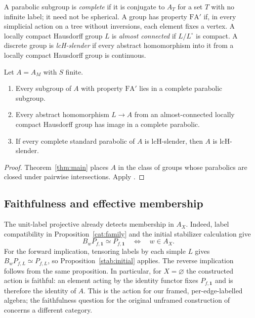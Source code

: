 A parabolic subgroup is \emph{complete} if it is conjugate to $A_T$
for a set $T$ with no infinite label; it need not be spherical.
A group has property $\mathrm{FA}'$ if, in every simplicial action on a
tree without inversions, each element fixes a vertex. A locally compact
Hausdorff group $L$ is \emph{almost connected} if $L/L^\circ$ is compact.
A discrete group is \emph{lcH-slender} if every abstract homomorphism
into it from a locally compact Hausdorff group is continuous.

\begin{corollary}
\label{cor:complete-parabolics}
Let $A=A_M$ with $S$ finite.
\begin{enumerate}
\item Every subgroup of $A$ with property $\mathrm{FA}'$ lies in a
complete parabolic subgroup.
\item Every abstract homomorphism $L\to A$ from an almost-connected
locally compact Hausdorff group has image in a complete parabolic.
\item If every complete standard parabolic of $A$ is lcH-slender,
then $A$ is lcH-slender.
\end{enumerate}
\end{corollary}
\begin{proof}
Theorem~\ref{thm:main} places $A$ in the class of groups whose parabolics
are closed under pairwise intersections. Apply
\cite[Proposition~1.3 and Theorem~1.7]{MoellerParisVarghese2024}.
\end{proof}


\subsection{Faithfulness and effective membership}
\label{sec:algorithms}

The unit-label projective already detects membership in $A_X$. Indeed,
label compatibility in Proposition~\ref{cat:family} and the initial
stabilizer calculation give
\begin{equation}
 B_wP_{f,\mathbf1}\simeq P_{f,\mathbf1}
 \quad\Longleftrightarrow\quad w\in A_X.
 \label{stab:single-detector}
\end{equation}
For the forward implication, tensoring labels by each simple $L$ gives
$B_wP_{f,L}\simeq P_{f,L}$, so Proposition~\ref{stab:initial} applies.
The reverse implication follows from the same proposition.
In particular, for $X=\varnothing$ the constructed action is faithful:
an element acting by the identity functor fixes $P_{f,\mathbf1}$ and
is therefore the identity of $A$. This is the action for our framed,
per-edge-labelled algebra; the faithfulness question for the original
unframed construction of \cite[Conjecture~7.10]{HengLicata2024} concerns
a different category.

